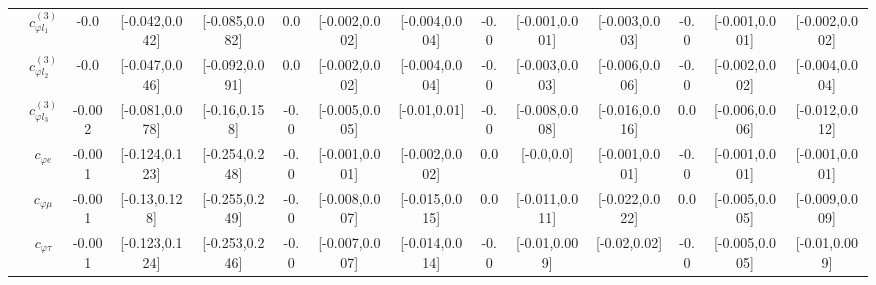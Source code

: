 \documentclass{article}
\begin{document}
\begin{table}[H]
\begin{tabular}{|c|c|c|c|c|c|c|c|c|c|c|c|c|c|}
 & $c_{\varphi l_1}^{(3)}$ & -0.0                             & [-0.042,0.042]                                 & [-0.085,0.082] & 0.0                             & [-0.002,0.002]                                 & [-0.004,0.004] & -0.0                             & [-0.001,0.001]                                 & [-0.003,0.003] & -0.0                             & [-0.001,0.001]                                 & [-0.002,0.002] \\ \cline{2-14}
 & $c_{\varphi l_2}^{(3)}$ & -0.0                             & [-0.047,0.046]                                 & [-0.092,0.091] & 0.0                             & [-0.002,0.002]                                 & [-0.004,0.004] & -0.0                             & [-0.003,0.003]                                 & [-0.006,0.006] & -0.0                             & [-0.002,0.002]                                 & [-0.004,0.004] \\ \cline{2-14}
 & $c_{\varphi l_3}^{(3)}$ & -0.002                             & [-0.081,0.078]                                 & [-0.16,0.158] & -0.0                             & [-0.005,0.005]                                 & [-0.01,0.01] & -0.0                             & [-0.008,0.008]                                 & [-0.016,0.016] & 0.0                             & [-0.006,0.006]                                 & [-0.012,0.012] \\ \cline{2-14}
 & $c_{\varphi e}$ & -0.001                             & [-0.124,0.123]                                 & [-0.254,0.248] & -0.0                             & [-0.001,0.001]                                 & [-0.002,0.002] & 0.0                             & [-0.0,0.0]                                 & [-0.001,0.001] & -0.0                             & [-0.001,0.001]                                 & [-0.001,0.001] \\ \cline{2-14}
 & $c_{\varphi \mu}$ & -0.001                             & [-0.13,0.128]                                 & [-0.255,0.249] & -0.0                             & [-0.008,0.007]                                 & [-0.015,0.015] & 0.0                             & [-0.011,0.011]                                 & [-0.022,0.022] & 0.0                             & [-0.005,0.005]                                 & [-0.009,0.009] \\ \cline{2-14}
 & $c_{\varphi \tau}$ & -0.001                             & [-0.123,0.124]                                 & [-0.253,0.246] & -0.0                             & [-0.007,0.007]                                 & [-0.014,0.014] & -0.0                             & [-0.01,0.009]                                 & [-0.02,0.02] & -0.0                             & [-0.005,0.005]                                 & [-0.01,0.009] \\ \cline{2-14}

\end{tabular}
\end{table}
\end{document}
